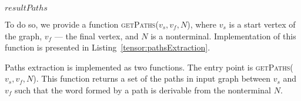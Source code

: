 \begin{algorithm}[h]
\begin{algorithmic}[1]
     		
     			\Else
     			\EndIf
     		\EndFor
     	\EndFor   
    \EndFor
    \State \Return $resultPaths$
\EndFunction
\end{algorithmic}
\end{algorithm}

To do so, we provide a function \textsc{getPaths}($v_s, v_f, N$), where $v_s$ is a start vertex of the graph, $v_f$ --- the final vertex, and $N$ is a nonterminal.
Implementation of this function is presented in Listing~\ref{tensor:pathsExtraction}.

Paths extraction is implemented as two functions.
The entry point is \textsc{getPaths}($v_s, v_f, N$).
This function returns a set of the paths in input graph between $v_s$ and $v_f$ such that the word formed by a path is derivable from the nonterminal $N$.


